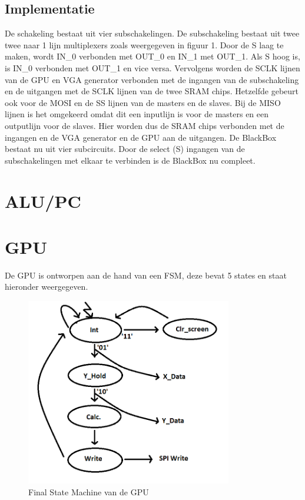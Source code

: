 \documentclass[oneside,dutch]{tudelft-report}
\begin{document}
\section{Implementatie}
De schakeling bestaat uit vier subschakelingen. De subschakeling bestaat uit twee twee naar 1 lijn multiplexers zoals weergegeven in figuur 1. Door de S laag te maken, wordt IN\_0 verbonden met OUT\_0 en IN\_1 met OUT\_1. Als S hoog is, is IN\_0 verbonden met OUT\_1 en vice versa. Vervolgens worden de SCLK lijnen van de GPU en VGA generator verbonden met de ingangen van de subschakeling en de uitgangen met de SCLK lijnen van de twee SRAM chips. Hetzelfde gebeurt ook voor de MOSI en de SS lijnen van de masters en de slaves. Bij de MISO lijnen is het omgekeerd omdat dit een inputlijn is voor de masters en een outputlijn voor de slaves. Hier worden dus de SRAM chips verbonden met de ingangen en de VGA generator en de GPU aan de uitgangen. De BlackBox bestaat nu uit vier subcircuits. Door de select (S) ingangen van de subschakelingen met elkaar te verbinden is de BlackBox nu compleet.

\newpage

\chapter{ALU/PC}
\newpage

\chapter{GPU}
De GPU is ontworpen aan de hand van een FSM, deze bevat 5 states en staat hieronder weergegeven.

\begin{figure}[H]
\center
\includegraphics[width=9cm]{FSM_GPU}
\caption{Final State Machine van de GPU}
\label{sub-GPU}
\end{figure}
\end{document}
